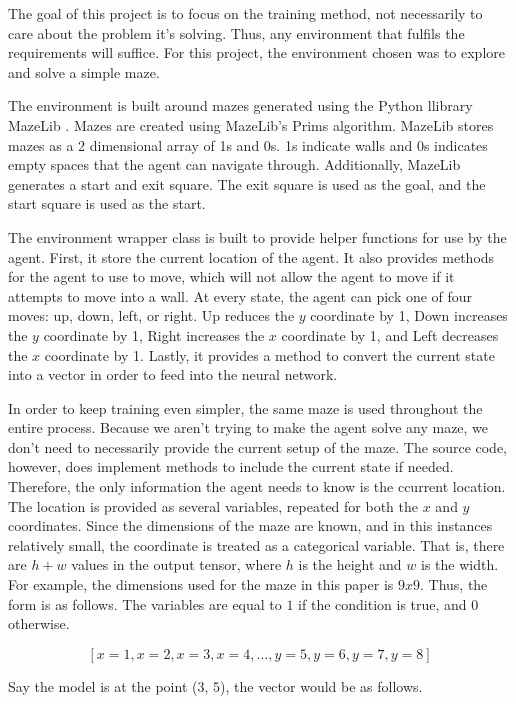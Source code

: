\documentclass[12pt]{article}
\begin{document}
The goal of this project is to focus on the training method, not necessarily to care about the problem it's solving.
Thus, any environment that fulfils the requirements will suffice.
For this project, the environment chosen was to explore and solve a simple maze.

The environment is built around mazes generated using the Python \cite{lang_python} llibrary MazeLib \cite{lib_mazelib}.
Mazes are created using MazeLib's Prims algorithm.
MazeLib stores mazes as a 2 dimensional array of 1s and 0s.
1s indicate walls and 0s indicates empty spaces that the agent can navigate through.
Additionally, MazeLib generates a start and exit square.
The exit square is used as the goal, and the start square is used as the start.

The environment wrapper class is built to provide helper functions for use by the agent.
First, it store the current location of the agent.
It also provides methods for the agent to use to move, which will not allow the agent to move if it attempts to move into a wall.
At every state, the agent can pick one of four moves: up, down, left, or right.
Up reduces the $y$ coordinate by 1, Down increases the $y$ coordinate by 1, Right increases the $x$ coordinate by 1, and Left decreases the $x$ coordinate by 1.
Lastly, it provides a method to convert the current state into a vector in order to feed into the neural network.

In order to keep training even simpler, the same maze is used throughout the entire process.
Because we aren't trying to make the agent solve any maze, we don't need to necessarily provide the current setup of the maze.
The source code, however, does implement methods to include the current state if needed.
Therefore, the only information the agent needs to know is the ccurrent location.
The location is provided as several variables, repeated for both the $x$ and $y$ coordinates.
Since the dimensions of the maze are known, and in this instances relatively small, the coordinate is treated as a categorical variable.
That is, there are $h + w$ values in the output tensor, where $h$ is the height and $w$ is the width.
For example, the dimensions used for the maze in this paper is $9x9$.
Thus, the form is as follows. The variables are equal to $1$ if the condition is true, and $0$ otherwise.

$$\left [ x = 1 , x = 2 , x = 3 , x = 4 , \hdots , y = 5 , y = 6 , y = 7 , y = 8 \right]$$

Say the model is at the point ($3$, $5$), the vector would be as follows.
\end{document}
